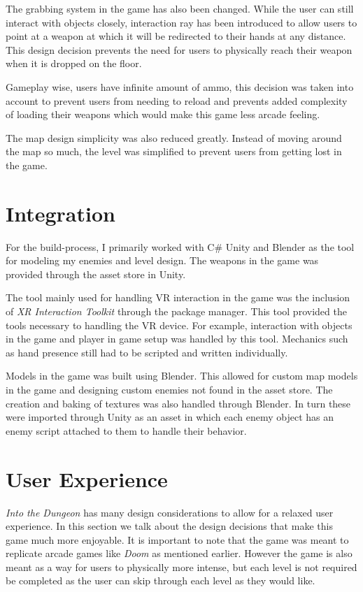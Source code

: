\documentclass[12pt, twoside]{article}
\begin{document}
The grabbing system in the game has also been changed. While the user can still
interact with objects closely, interaction ray has been introduced to allow
users to point at a weapon at which it will be redirected to their hands at any
distance. This design decision prevents the need for users to physically reach
their weapon when it is dropped on the floor.\par

Gameplay wise, users have infinite amount of ammo, this decision was taken into
account to prevent users from needing to reload and prevents added complexity of
loading their weapons which would make this game less arcade feeling.\par

The map design simplicity was also reduced greatly. Instead of moving around the
map so much, the level was simplified to prevent users from getting lost in the
game.
\newpage
\section{Integration}
For the build-process, I primarily worked with C\# Unity and Blender as the tool
for modeling my enemies and level design. The weapons in the game was provided
through the asset store in Unity.\par 

The tool mainly used for handling VR interaction in the game was the inclusion
of \emph{XR Interaction Toolkit} through the package manager. This tool provided
the tools necessary to handling the VR device. For example, interaction with
objects in the game and player in game setup was handled by this tool. Mechanics
such as hand presence still had to be scripted and written individually. \par

Models in the game was built using Blender. This allowed for custom map models
in the game and designing custom enemies not found in the asset store. The
creation and baking of textures was also handled through Blender.  In turn these
were imported through Unity as an asset in which each enemy object has an enemy
script attached to them to handle their behavior.

\newpage
\section{User Experience}
\emph{Into the Dungeon} has many design considerations to allow for a relaxed
user experience. In this section we talk about the design decisions that make
this game much more enjoyable. It is important to note that the game was meant
to replicate arcade games like \emph{Doom} as mentioned earlier. However the
game is also meant as a way for users to physically more intense, but each level
is not required be completed as the user can skip through each level as they
would like.
\end{document}
